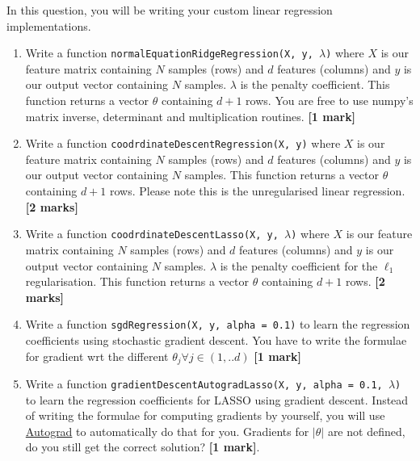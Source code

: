 \documentclass[colorlinks,linkcolor=true]{article}
\begin{document}
\item In this question, you will be writing your custom linear regression implementations. 
\begin{enumerate}
	\item Write a function \texttt{normalEquationRidgeRegression(X, y, $\lambda$)} where $X$ is our feature matrix containing $N$ samples (rows) and $d$ features (columns) and $y$ is our output vector containing $N$ samples.  $\lambda$ is the penalty coefficient. This function returns a vector $\theta$ containing $d+1$ rows. You are free to use numpy's matrix inverse, determinant and multiplication routines. \textbf{[1 mark]}
	\item Write a function \texttt{coodrdinateDescentRegression(X, y)} where $X$ is our feature matrix containing $N$ samples (rows) and $d$ features (columns) and $y$ is our output vector containing $N$ samples.  This function returns a vector $\theta$ containing $d+1$ rows. Please note this is the unregularised linear regression. \textbf{[2 marks]}
	\item Write a function \texttt{coodrdinateDescentLasso(X, y, $\lambda$)} where $X$ is our feature matrix containing $N$ samples (rows) and $d$ features (columns) and $y$ is our output vector containing $N$ samples.  $\lambda$ is the penalty coefficient for the $\ell_1$ regularisation. This function returns a vector $\theta$ containing $d+1$ rows.  \textbf{[2 marks]}
	\item Write a function \texttt{sgdRegression(X, y, alpha = 0.1)} to learn the regression coefficients using stochastic gradient descent. You have to write the formulae for gradient wrt the different $\theta_j \forall j \in (1, ..d)$ \textbf{[1 mark]}
	\item Write a function \texttt{gradientDescentAutogradLasso(X, y, alpha = 0.1, $\lambda$)} to learn the regression coefficients for LASSO using gradient descent. Instead of writing the formulae for computing gradients by yourself, you will use \href{https://github.com/HIPS/autograd}{Autograd} to automatically do that for you.  Gradients for $|\theta|$ are not defined, do you still get the correct solution? \textbf{[1 mark]}.
\end{enumerate}
\end{document}
